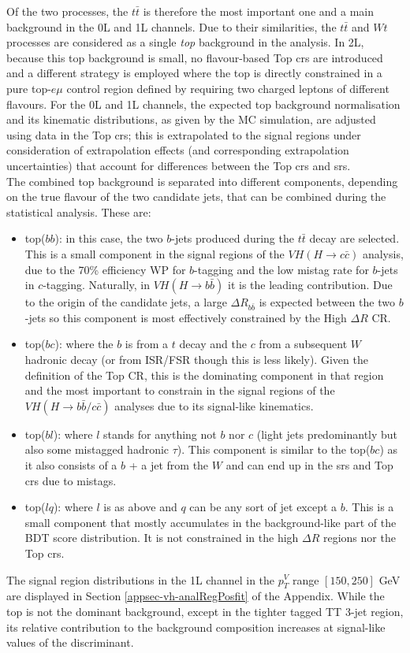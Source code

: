 Of the two processes, the $t\bar{t}$ is therefore the most important one and a main background in the 0L and 1L channels. Due to their similarities, the $t\bar{t}$ and $Wt$ processes are considered as a single \textit{top} background in the analysis. In 2L, because this top background is small, no flavour-based Top \glspl{cr} are introduced and a different strategy is employed where the top is directly constrained in a pure top-$e\mu$ control region defined by requiring two charged leptons of different flavours. For the 0L and 1L channels, the expected top background normalisation and its kinematic distributions, as given by the MC simulation, are adjusted using data in the Top \glspl{cr}; this is extrapolated to the signal regions under consideration of extrapolation effects (and corresponding extrapolation uncertainties) that account for differences between the Top \glspl{cr} and \glspl{sr}. \\

The combined top background is separated into different components, depending on the true flavour of the two candidate jets, that can be combined during the statistical analysis. These are:
\begin{itemize}
\item top($bb$): in this case, the two $b$-jets produced during the $t\bar{t}$ decay are selected. This is a small component in the signal regions of the $VH(H\rightarrow c\bar{c})$ analysis, due to the 70\% efficiency WP for $b$-tagging and the low mistag rate for $b$-jets in $c$-tagging. Naturally, in $VH(H\rightarrow b\bar{b})$ it is the leading contribution. Due to the origin of the candidate jets, a large $\Delta R_{b\bar{b}}$ is expected between the two $b$-jets so this component is most effectively constrained by the High $\Delta R$ CR. 
\item top($bc$): where the $b$ is from a $t$ decay and the $c$ from a subsequent $W$ hadronic decay (or from ISR/FSR though this is less likely). Given the definition of the Top CR, this is the dominating component in that region and the most important to constrain in the signal regions of the $VH(H\rightarrow b\bar{b}/c\bar{c})$ analyses due to its signal-like kinematics. 
\item top($bl$): where $l$ stands for anything not $b$ nor $c$ (light jets predominantly but also some mistagged hadronic $\tau$). This component is similar to the top($bc$) as it also consists of a $b$ + a jet from the $W$ and can end up in the \glspl{sr} and Top \glspl{cr} due to mistags.
\item top($lq$): where $l$ is as above and $q$ can be any sort of jet except a $b$. This is a small component that mostly accumulates in the background-like part of the BDT score distribution. It is not constrained in the high $\Delta R$ regions nor the Top \glspl{cr}.
\end{itemize}
The signal region distributions in the 1L channel in the $p_T^V$ range $[150, 250]$ GeV are displayed in Section \ref{appsec-vh-analRegPosfit} of the Appendix. While the top is not the dominant background, except in the tighter tagged TT 3-jet region, its relative contribution to the background composition increases at signal-like values of the discriminant. \\

